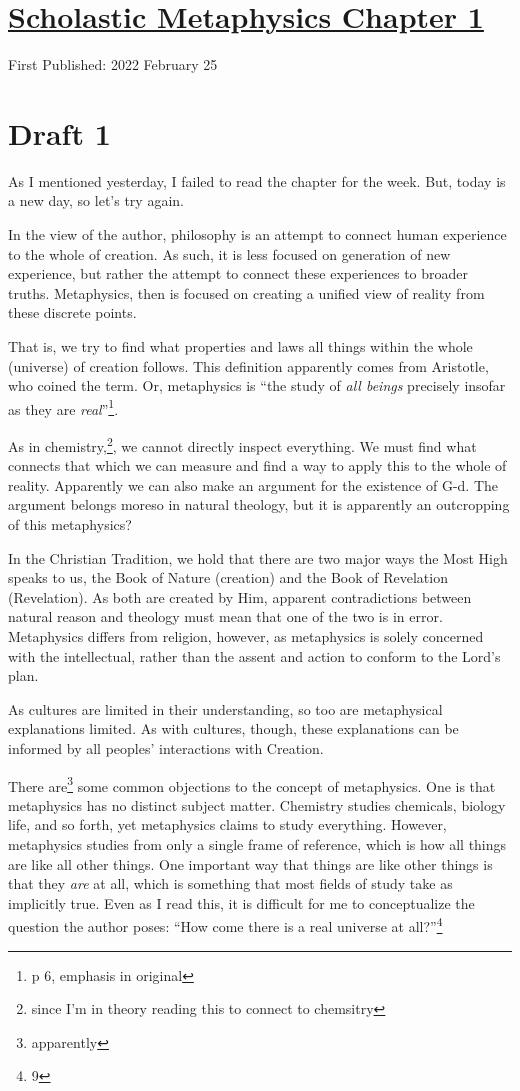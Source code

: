 \documentclass[12pt]{article}[titlepage]
\newcommand{\say}[1]{``#1''}
\newcommand{\1}{\={a}}
\newcommand{\2}{\={e}}
\newcommand{\3}{\={\i}}
\newcommand{\4}{\=o}
\newcommand{\5}{\=u}
\newcommand{\6}{\={A}}
\renewcommand{\,}{\textsuperscript{,}}
\begin{document}
\doublespacing
\section{\href{scholastic-metaphysics-2.html}{Scholastic Metaphysics Chapter 1}}
First Published: 2022 February 25

\section{Draft 1}
As I mentioned yesterday, I failed to read the chapter for the week.
But, today is a new day, so let's try again.

In the view of the author, philosophy is an attempt to connect human experience to the whole of creation.
As such, it is less focused on generation of new experience, but rather the attempt to connect these experiences to broader truths.
Metaphysics, then is focused on creating a unified view of reality from these discrete points.

That is, we try to find what properties and laws all things within the whole (universe) of creation follows.
This definition apparently comes from Aristotle, who coined the term.
Or, metaphysics is \say{the study of \emph{all beings} precisely insofar as they are \emph{real}}\footnote{p 6, emphasis in original}.

As in chemistry,\footnote{since I'm in theory reading this to connect to chemsitry}, we cannot directly inspect everything.
We must find what connects that which we can measure and find a way to apply this to the whole of reality.
Apparently we can also make an argument for the existence of G-d.
The argument belongs moreso in natural theology, but it is apparently an outcropping of this metaphysics?

In the Christian Tradition, we hold that there are two major ways the Most High speaks to us, the Book of Nature (creation) and the Book of Revelation (Revelation).
As both are created by Him, apparent contradictions between natural reason and theology must mean that one of the two is in error.
Metaphysics differs from religion, however, as metaphysics is solely concerned with the intellectual, rather than the assent and action to conform to the Lord's plan.

As cultures are limited in their understanding, so too are metaphysical explanations limited.
As with cultures, though, these explanations can be informed by all peoples' interactions with Creation.

There are\footnote{apparently} some common objections to the concept of metaphysics.
One is that metaphysics has no distinct subject matter.
Chemistry studies chemicals, biology life, and so forth, yet metaphysics claims to study everything.
However, metaphysics studies from only a single frame of reference, which is how all things are like all other things.
One important way that things are like other things is that they \emph{are} at all, which is something that most fields of study take as implicitly true.
Even as I read this, it is difficult for me to conceptualize the question the author poses: \say{How come there is a real universe at all?}\footnote{9}
\end{document}

